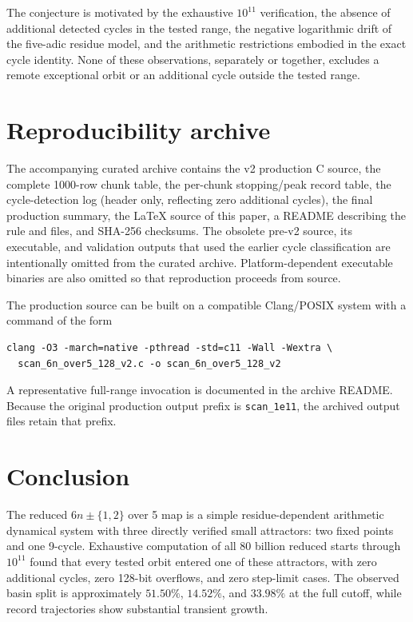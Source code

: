 \documentclass[11pt]{article}
\begin{document}
The conjecture is motivated by the exhaustive $10^{11}$ verification, the absence of additional detected cycles in the tested range, the negative logarithmic drift of the five-adic residue model, and the arithmetic restrictions embodied in the exact cycle identity. None of these observations, separately or together, excludes a remote exceptional orbit or an additional cycle outside the tested range.

\section{Reproducibility archive}
The accompanying curated archive contains the v2 production C source, the complete 1000-row chunk table, the per-chunk stopping/peak record table, the cycle-detection log (header only, reflecting zero additional cycles), the final production summary, the \LaTeX{} source of this paper, a README describing the rule and files, and SHA-256 checksums. The obsolete pre-v2 source, its executable, and validation outputs that used the earlier cycle classification are intentionally omitted from the curated archive. Platform-dependent executable binaries are also omitted so that reproduction proceeds from source.

The production source can be built on a compatible Clang/POSIX system with a command of the form
\begin{verbatim}
clang -O3 -march=native -pthread -std=c11 -Wall -Wextra \
  scan_6n_over5_128_v2.c -o scan_6n_over5_128_v2
\end{verbatim}
A representative full-range invocation is documented in the archive README. Because the original production output prefix is \texttt{scan\_1e11}, the archived output files retain that prefix.

\section{Conclusion}
The reduced $6n\pm\{1,2\}$ over 5 map is a simple residue-dependent arithmetic dynamical system with three directly verified small attractors: two fixed points and one 9-cycle. Exhaustive computation of all $80$ billion reduced starts through $10^{11}$ found that every tested orbit entered one of these attractors, with zero additional cycles, zero 128-bit overflows, and zero step-limit cases. The observed basin split is approximately $51.50\%$, $14.52\%$, and $33.98\%$ at the full cutoff, while record trajectories show substantial transient growth.
\end{document}
